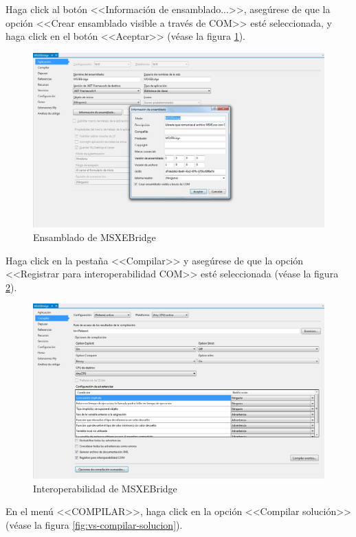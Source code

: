 \newpage

Haga click al bot\'{o}n <<Informaci\'{o}n de ensamblado...>>, aseg\'{u}rese de que la opci\'{o}n <<Crear ensamblado visible a trav\'{e}s de COM>> est\'{e} seleccionada, y haga click en el bot\'{o}n <<Aceptar>> (v\'{e}ase la figura \ref{fig:vs-ensamblado}).

\begin{figure}[H]
  \centering
  \includegraphics[width=.75\linewidth]{./img/vs-ensamblado.jpg}
\caption[]{Ensamblado de MSXEBridge\label{fig:vs-ensamblado}}
\end{figure}

Haga click en la pesta\~{n}a <<Compilar>> y aseg\'{u}rese de que la opci\'{o}n <<Registrar para interoperabilidad COM>> est\'{e} seleccionada (v\'{e}ase la figura \ref{fig:vs-compilar}).

\begin{figure}[H]
  \centering
  \includegraphics[width=.75\linewidth]{./img/vs-compilar.jpg}
\caption[]{Interoperabilidad de MSXEBridge\label{fig:vs-compilar}}
\end{figure}

\newpage

En el men\'{u} <<COMPILAR>>, haga click en la opci\'{o}n <<Compilar soluci\'{o}n>> (v\'{e}ase la figura \ref{fig:vs-compilar-solucion}).

